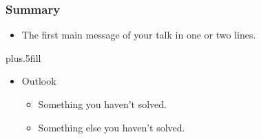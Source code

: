 \documentclass{beamer}
\begin{document}
\begin{frame}
\frametitle<presentation>{Summary}

\begin{itemize}
  \item The \alert{first main message} of your talk in one or two lines.
\end{itemize}

\vskip0pt plus.5fill
\begin{itemize}
  \item Outlook
  \begin{itemize}
    \item Something you haven't solved.
    \item Something else you haven't solved.
  \end{itemize}
\end{itemize}
\end{frame}
\end{document}
